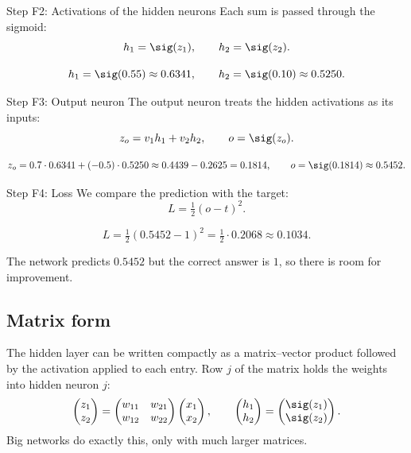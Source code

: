\begin{stepbox}{Step F2: Activations of the hidden neurons}
Each sum is passed through the sigmoid:
\[
h_1=\sig(z_1),\qquad h_2=\sig(z_2).
\]
\end{stepbox}

\[
h_1=\sig(0.55)\approx0.6341,\qquad h_2=\sig(0.10)\approx0.5250.
\]

\begin{stepbox}{Step F3: Output neuron}
The output neuron treats the hidden activations as its inputs:
\[
z_o=v_1h_1+v_2h_2,\qquad o=\sig(z_o).
\]
\end{stepbox}

\[
z_o=0.7\cdot0.6341+(-0.5)\cdot0.5250\approx0.4439-0.2625=0.1814,\qquad o=\sig(0.1814)\approx0.5452.
\]

\begin{stepbox}{Step F4: Loss}
We compare the prediction with the target:
\[
L=\tfrac12(o-t)^2.
\]
\end{stepbox}

\[
L=\tfrac12(0.5452-1)^2=\tfrac12\cdot0.2068\approx0.1034.
\]

The network predicts $0.5452$ but the correct answer is $1$, so there is room for improvement.

\subsection*{Matrix form}
The hidden layer can be written compactly as a matrix--vector product followed by the activation applied to each entry. Row $j$ of the matrix holds the weights into hidden neuron $j$:
\[
\begin{pmatrix}z_1\\z_2\end{pmatrix}
=\begin{pmatrix}w_{11}&w_{21}\\w_{12}&w_{22}\end{pmatrix}
\begin{pmatrix}x_1\\x_2\end{pmatrix},
\qquad
\begin{pmatrix}h_1\\h_2\end{pmatrix}=\begin{pmatrix}\sig(z_1)\\\sig(z_2)\end{pmatrix}.
\]
Big networks do exactly this, only with much larger matrices.


